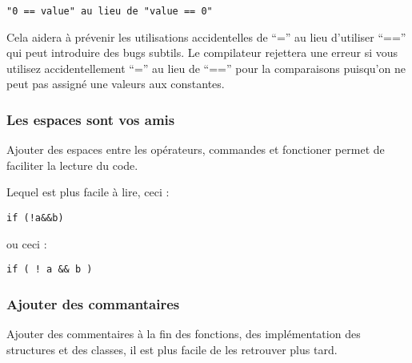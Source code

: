 \begin{verbatim}
"0 == value" au lieu de "value == 0"
\end{verbatim}

Cela aidera \`a pr\'evenir les utilisations accidentelles de ``='' au lieu d'utiliser ``=='' qui peut introduire des bugs subtils. Le compilateur rejettera une erreur si vous utilisez accidentellement ``='' au lieu de ``=='' pour la comparaisons puisqu'on ne peut pas assign\'e une valeurs aux constantes.

\subsubsection{Les espaces sont vos amis}
Ajouter des espaces entre les op\'erateurs, commandes et fonctioner permet de faciliter la lecture du code.

Lequel est plus facile \`a lire, ceci :

\begin{verbatim}
if (!a&&b)
\end{verbatim}

ou ceci :

\begin{verbatim}
if ( ! a && b )
\end{verbatim}

\subsubsection{Ajouter des commantaires}
Ajouter des commentaires \`a la fin des fonctions, des impl\'ementation des structures et des classes, il est plus facile de les retrouver plus tard.

